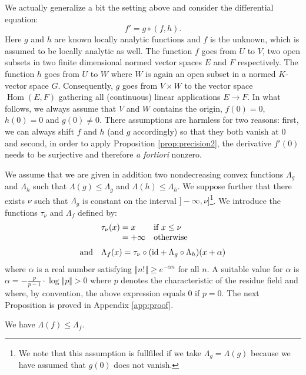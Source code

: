 \documentclass{sig-alternate}
\DeclareMathOperator{\Hom}{Hom}
\begin{document}
We actually generalize a bit the setting above and consider the 
differential equation:
\begin{equation}
\label{eq:diffequah}
f' = g \circ (f, h).
\end{equation}
Here $g$ and $h$ are known locally analytic functions and $f$ is the 
unknown, which is assumed to be locally analytic as well. The function
$f$ goes from $U$ to $V$, two open subsets in two finite dimensional
normed vector spaces $E$ 
and $F$ respectively. The function $h$ goes from $U$ to $W$ where $W$
is again an open subset in a normed $K$-vector space $G$. Consequently,
$g$ goes from $V \times W$ to the vector space $\Hom(E,F)$ gathering
all (continuous) linear applications $E \to F$.
In what follows, we always assume that $V$ and $W$ contains the origin, 
$f(0) = 0$, $h(0) = 0$ and $g(0) \neq 0$. There assumptions are harmless 
for two reasons: first, we can always shift $f$ and $h$ (and $g$ 
accordingly) so that they both vanish at $0$ and second, in order to 
apply Proposition \ref{prop:precision2}, the derivative $f'(0)$ 
needs to be surjective and therefore \emph{a fortiori} nonzero.

We assume that we are given in addition two nondecreasing convex 
functions $\Lambda_g$ and $\Lambda_h$ such that $\Lambda(g) \leq 
\Lambda_g$ and $\Lambda(h) \leq \Lambda_h$. We suppose further that 
there exists $\nu$ such that $\Lambda_g$ is constant on the interval 
$]{-}\infty, \nu]$\footnote{We note that this assumption is fullfiled if 
we take $\Lambda_g = \Lambda(g)$ because we have assumed that $g(0)$ 
does not vanish.}. We introduce the functions $\tau_\nu$ and $\Lambda_f$ 
defined by:
$$\begin{array}{rll}
&\tau_\nu(x) = x & \text{if } x \leq \nu \\
& \hphantom{\tau_\nu(x)} = {+} \infty & \text{otherwise} \medskip \\
\text{and} &
\multicolumn{2}{l}{\Lambda_f(x) = 
  \tau_\nu \circ (\id + \Lambda_g \circ \Lambda_h)(x + \alpha)}
\end{array}$$
where $\alpha$ is a real number satisfying $\Vert n! \Vert \geq 
e^{-\alpha n}$ for all $n$. A suitable value for $\alpha$ is $\alpha = - 
\frac p {p-1} \cdot \log \Vert p \Vert > 0$ where $p$ denotes the 
characteristic of the residue field and where, by convention, the above 
expression equals $0$ if $p = 0$.
The next Proposition is proved in Appendix \ref{app:proof}.

\begin{prop}
\label{prop:boundLambdaf}\label{PROP:BOUNDLAMBDAF}
We have $\Lambda(f) \leq \Lambda_f$.
\end{prop}
\end{document}
